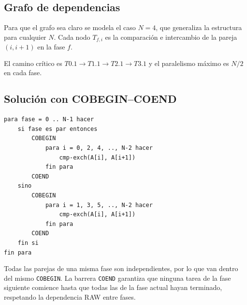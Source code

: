 \subsection*{Grafo de dependencias}
Para que el grafo sea claro se modela el caso $N = 4$, que generaliza la
estructura para cualquier $N$. Cada nodo $T_{f,i}$ es la comparaci\'on e
intercambio de la pareja $(i, i+1)$ en la fase $f$.

\begin{center}
\end{center}

El camino cr\'itico es $T0.1 \rightarrow T1.1 \rightarrow T2.1 \rightarrow
T3.1$ y el paralelismo m\'aximo es $N/2$ en cada fase.

\subsection*{Soluci\'on con COBEGIN--COEND}
\begin{lstlisting}
para fase = 0 .. N-1 hacer
    si fase es par entonces
        COBEGIN
            para i = 0, 2, 4, .., N-2 hacer
                cmp-exch(A[i], A[i+1])
            fin para
        COEND
    sino
        COBEGIN
            para i = 1, 3, 5, .., N-2 hacer
                cmp-exch(A[i], A[i+1])
            fin para
        COEND
    fin si
fin para
\end{lstlisting}

\noindent
Todas las parejas de una misma fase son independientes, por lo que van dentro
del mismo \texttt{COBEGIN}. La barrera \texttt{COEND} garantiza que ninguna
tarea de la fase siguiente comience hasta que todas las de la fase actual hayan
terminado, respetando la dependencia RAW entre fases.
